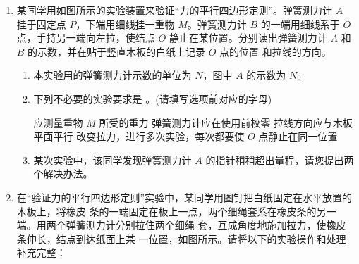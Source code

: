 \begin{enumerate}
\renewcommand{\labelenumi}{\arabic{enumi}.}
\item
{}
某同学用如图所示的实验装置来验证“力的平行四边形定则”。弹簧测力计 $ A $ 挂于固定点
$ P $，下端用细线挂一重物 $ M $。弹簧测力计 $ B $ 的一端用细线系于 $ O $ 点，手持另一端向左拉，使结点 $ O $
静止在某位置。分别读出弹簧测力计 $ A $ 和 $ B $ 的示数，并在贴于竖直木板的白纸上记录 $ O $ 点的位置
和拉线的方向。
\begin{enumerate}
\renewcommand{\labelenumi}{\arabic{enumi}.}
\item
本实验用的弹簧测力计示数的单位为 $ N $，图中 $ A $ 的示数为  $ N $。
\begin{figure}[h!]
\centering

\end{figure}



\item 
下列不必要的实验要求是  。(请填写选项前对应的字母)

\fourchoices
{应测量重物 $ M $ 所受的重力}
{弹簧测力计应在使用前校零}
{拉线方向应与木板平面平行}
{改变拉力，进行多次实验，每次都要使 $ O $ 点静止在同一位置}

\item 
某次实验中，该同学发现弹簧测力计 $ A $ 的指针稍稍超出量程，请您提出两个解决办法。



\end{enumerate}



\newpage
\item
{}
在“验证力的平行四边形定则”实验中，某同学用图钉把白纸固定在水平放置的木板上，将橡皮
条的一端固定在板上一点，两个细绳套系在橡皮条的另一端。用两个弹簧测力计分别拉住两个细绳
套，互成角度地施加拉力，使橡皮条伸长，结点到达纸面上某
一位置，如图所示。请将以下的实验操作和处理补充完整：
\begin{figure}[h!]
\centering

\end{figure}


\end{enumerate}
